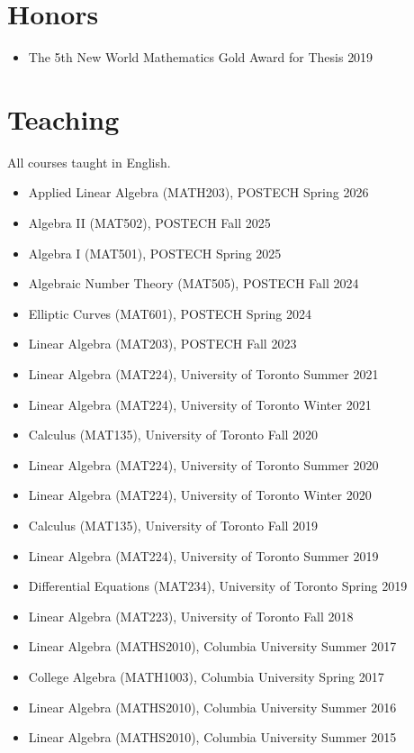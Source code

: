 \documentclass[a4paper,11pt]{article}
\newcommand{\dates}[1]{\hfill{\small #1}}
\begin{document}
\section{Honors}

\begin{itemize}[label={}]
  \item The 5th New World Mathematics Gold Award for Thesis \dates{2019}
\end{itemize}

\section{Teaching}

All courses taught in English.

\begin{itemize}[label={}, itemsep=.15em]
  \item Applied Linear Algebra (MATH203), POSTECH \dates{Spring 2026}
  \item Algebra II (MAT502), POSTECH \dates{Fall 2025}
  \item Algebra I (MAT501), POSTECH \dates{Spring 2025}
  \item Algebraic Number Theory (MAT505), POSTECH \dates{Fall 2024}
  \item Elliptic Curves (MAT601), POSTECH \dates{Spring 2024}
  \item Linear Algebra (MAT203), POSTECH \dates{Fall 2023}
  \item Linear Algebra (MAT224), University of Toronto \dates{Summer 2021}
  \item Linear Algebra (MAT224), University of Toronto \dates{Winter 2021}
  \item Calculus (MAT135), University of Toronto \dates{Fall 2020}
  \item Linear Algebra (MAT224), University of Toronto \dates{Summer 2020}
  \item Linear Algebra (MAT224), University of Toronto \dates{Winter 2020}
  \item Calculus (MAT135), University of Toronto \dates{Fall 2019}
  \item Linear Algebra (MAT224), University of Toronto \dates{Summer 2019}
  \item Differential Equations (MAT234), University of Toronto \dates{Spring 2019}
  \item Linear Algebra (MAT223), University of Toronto \dates{Fall 2018}
  \item Linear Algebra (MATHS2010), Columbia University \dates{Summer 2017}
  \item College Algebra (MATH1003), Columbia University \dates{Spring 2017}
  \item Linear Algebra (MATHS2010), Columbia University \dates{Summer 2016}
  \item Linear Algebra (MATHS2010), Columbia University \dates{Summer 2015}
\end{itemize}
\end{document}
